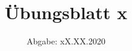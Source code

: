 

\subject{Computational Physics}
\title{Übungsblatt x}
\date{%
  Abgabe: xX.XX.2020
}



\maketitle
\thispagestyle{empty}
\newpage







